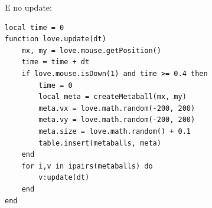 \documentclass[a4paper,oneside,12pt]{article}
\begin{document}
E no update:

\begin{lstlisting}[language={[5.2]Lua}]
local time = 0
function love.update(dt)
    mx, my = love.mouse.getPosition()
    time = time + dt
    if love.mouse.isDown(1) and time >= 0.4 then
        time = 0
        local meta = createMetaball(mx, my)
        meta.vx = love.math.random(-200, 200)
        meta.vy = love.math.random(-200, 200)
        meta.size = love.math.random() + 0.1
        table.insert(metaballs, meta)
    end
    for i,v in ipairs(metaballs) do
        v:update(dt)
    end
end
\end{lstlisting}
\end{document}
